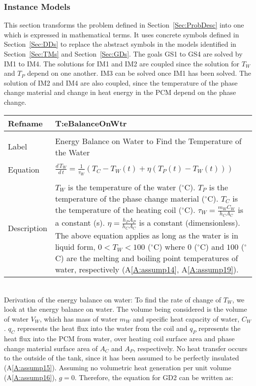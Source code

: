 \documentclass[12pt]{article}
\begin{document}
\subsubsection{Instance Models}
\label{Sec:IMs}
This section transforms the problem defined in Section~\ref{Sec:ProbDesc} into one which is expressed in mathematical terms. It uses concrete symbols defined in Section~\ref{Sec:DDs} to replace the abstract symbols in the models identified in Section~\ref{Sec:TMs} and Section~\ref{Sec:GDs}.
The goals GS1 to GS4 are solved by IM1 to IM4. The solutions for IM1 and IM2 are coupled since the solution for ${T_{W}}$ and ${T_{P}}$ depend on one another. IM3 can be solved once IM1 has been solved. The solution of IM2 and IM4 are also coupled, since the temperature of the phase change material and change in heat energy in the PCM depend on the phase change.
~\newline
\noindent \begin{minipage}{\textwidth}
\begin{tabular}{p{} p{}}
\toprule \textbf{Refname} & \textbf{T:eBalanceOnWtr}
\label{T:eBalanceOnWtr}
\\ \midrule \\
Label & Energy Balance on Water to Find the Temperature of the Water
\\ \midrule \\
Equation & $\frac{d\,{T_{W}}}{d\,t}=\frac{1}{{τ_{W}}} \left({T_{C}}-{T_{W}}\left(t\right)+η \left({T_{P}}\left(t\right)-{T_{W}}\left(t\right)\right)\right)$
\\ \midrule \\
Description & ${T_{W}}$ is the temperature of the water (${}^{\circ}$C). ${T_{P}}$ is the temperature of the phase change material (${}^{\circ}$C). ${T_{C}}$ is the temperature of the heating coil (${}^{\circ}$C). ${τ_{W}}=\frac{{m_{W}} {C_{W}}}{{h_{C}} {A_{C}}}$ is a constant (s). $η=\frac{{h_{P}} {A_{P}}}{{h_{C}} {A_{C}}}$ is a constant (dimensionless). The above equation applies as long as the water is in liquid form, $0<{T_{W}}<100$ (${}^{\circ}$C) where $0$ (${}^{\circ}$C) and $100$ (${}^{\circ}$C) are the melting and boiling point temperatures of water, respectively (A\ref{A:assump14}, A\ref{A:assump19}).
\\ \bottomrule \end{tabular}
\end{minipage}\\
Derivation of the energy balance on water:
To find the rate of change of ${T_{W}}$, we look at the energy balance on water. The volume being considered is the volume of water ${V_{W}}$, which has mass of water ${m_{W}}$ and specific heat capacity of water, ${C_{W}}$. ${q_{C}}$ represents the heat flux into the water from the coil and ${q_{P}}$ represents the heat flux into the PCM from water, over heating coil surface area and phase change material surface area of ${A_{C}}$ and ${A_{P}}$, respectively. No heat transfer occurs to the outside of the tank, since it has been assumed to be perfectly insulated (A\ref{A:assump15}). Assuming no volumetric heat generation per unit volume (A\ref{A:assump16}), $g=0$. Therefore, the equation for GD2 can be written as:
\end{document}
